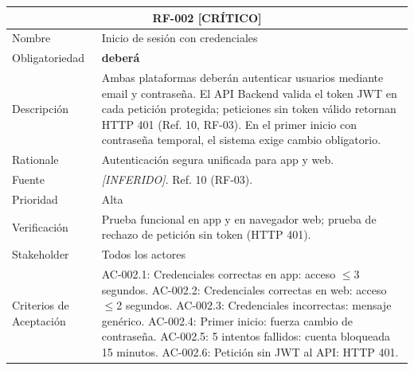 \documentclass[12pt, a4paper]{article}
\newcommand{\criticomark}{\textcolor{criticolor}{\textbf{[CR\'ITICO]}}}
\newcommand{\inferido}{\textcolor{medio}{\textit{[INFERIDO]}}}
\begin{document}
\begin{longtable}{|p{3cm}|p{11.5cm}|}
\hline
\multicolumn{2}{|c|}{\textbf{RF-002} \criticomark} \\
\hline
Nombre & Inicio de sesi\'on con credenciales \\
\hline
Obligatoriedad & \textbf{deber\'a} \\
\hline
Descripci\'on & Ambas plataformas deber\'an autenticar usuarios mediante email y contrase\~na. El API Backend valida el token JWT en cada petici\'on protegida; peticiones sin token v\'alido retornan HTTP 401 (Ref. 10, RF-03). En el primer inicio con contrase\~na temporal, el sistema exige cambio obligatorio. \\
\hline
Rationale & Autenticaci\'on segura unificada para app y web. \\
\hline
Fuente & \inferido{}. Ref. 10 (RF-03). \\
\hline
Prioridad & Alta \\
\hline
Verificaci\'on & Prueba funcional en app y en navegador web; prueba de rechazo de petici\'on sin token (HTTP 401). \\
\hline
Stakeholder & Todos los actores \\
\hline
Criterios de Aceptaci\'on &
AC-002.1: Credenciales correctas en app: acceso $\leq$3 segundos. \newline
AC-002.2: Credenciales correctas en web: acceso $\leq$2 segundos. \newline
AC-002.3: Credenciales incorrectas: mensaje gen\'erico. \newline
AC-002.4: Primer inicio: fuerza cambio de contrase\~na. \newline
AC-002.5: 5 intentos fallidos: cuenta bloqueada 15 minutos. \newline
AC-002.6: Petici\'on sin JWT al API: HTTP 401. \\
\hline
\end{longtable}
\end{document}
